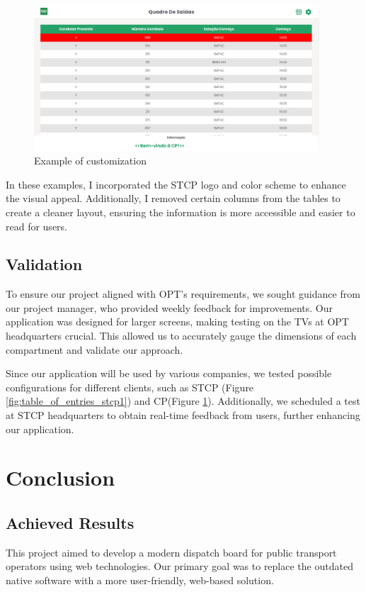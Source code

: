 \documentclass[10pt]{article}
\begin{document}
        \begin{figure}[H]
            \centering
            \includegraphics[width=0.95\textwidth]{table_of_exits_cp}
            \caption{Example of customization}
            \label{fig:table_of_exits_cp}
        \end{figure}


        In these examples, I incorporated the STCP logo and color scheme to enhance the visual appeal.
        Additionally, I removed certain columns from the tables to create a cleaner layout, ensuring the information is more accessible and easier to read for users.

        \subsection{Validation}

        To ensure our project aligned with OPT's requirements, we sought guidance from our project manager, who provided weekly feedback for improvements. Our application was designed for larger screens, making testing on the TVs at OPT headquarters crucial. This allowed us to accurately gauge the dimensions of each compartment and validate our approach. 
        
        Since our application will be used by various companies, we tested possible configurations for different clients, such as STCP (Figure \ref{fig:table_of_entries_stcp1}) and CP(Figure \ref{fig:table_of_exits_cp}). Additionally, we scheduled a test at STCP headquarters to obtain real-time feedback from users, further enhancing our application.


        \section{Conclusion}


        \subsection{Achieved Results}
        This project aimed to develop a modern dispatch board for public transport operators using web technologies. Our primary goal was to replace the outdated native software with a more user-friendly, web-based solution. 
\end{document}
